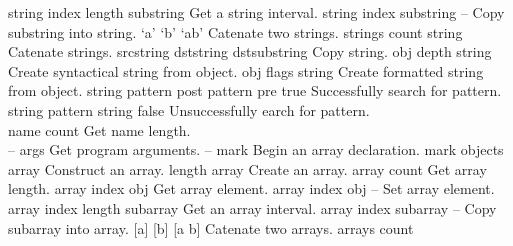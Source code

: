 \begin{longtable}{}
\hline
\optableent
	{string index length}
	{{\bf {}}}
	{substring}
	{Get a string interval.}
\hline
\optableent
	{string index substring}
	{{\bf {}}}
	{--}
	{Copy substring into string.}
\hline
\optableent
	{`a' `b'}
	{{\bf {}}}
	{`ab'}
	{Catenate two strings.}
\hline
\optableent
	{strings count}
	{{\bf {}}}
	{string}
	{Catenate strings.}
\hline
\optableent
	{srcstring dststring}
	{{\bf {}}}
	{dstsubstring}
	{Copy string.}
\hline
\optableent
	{obj depth}
	{{\bf {}}}
	{string}
	{Create syntactical string from object.}
\hline
\optableent
	{obj flags}
	{{\bf {}}}
	{string}
	{Create formatted string from object.}
\hline
\optableent
	{string pattern}
	{{\bf {}}}
	{post pattern pre true}
	{Successfully search for pattern.}
\optableent
	{string pattern}
	{{\bf {}}}
	{string false}
	{Unsuccessfully earch for pattern.}
\hline \hline
{} \\
\hline \hline
\optableent
	{name}
	{{\bf {}}}
	{count}
	{Get name length.}
\hline \hline
{} \\
\hline \hline
\optableent
	{--}
	{{\bf {}}}
	{args}
	{Get program arguments.}
\hline
\optableent
	{--}
	{{\bf \htmlref{[}{systemdict:sym_lb}}}
	{mark}
	{Begin an array declaration.}
\hline
\optableent
	{mark objects}
	{{\bf \htmlref{]}{systemdict:sym_rb}}}
	{array}
	{Construct an array.}
\hline
\optableent
	{length}
	{{\bf {}}}
	{array}
	{Create an array.}
\hline
\optableent
	{array}
	{{\bf {}}}
	{count}
	{Get array length.}
\hline
\optableent
	{array index}
	{{\bf {}}}
	{obj}
	{Get array element.}
\hline
\optableent
	{array index obj}
	{{\bf {}}}
	{--}
	{Set array element.}
\hline
\optableent
	{array index length}
	{{\bf {}}}
	{subarray}
	{Get an array interval.}
\hline
\optableent
	{array index subarray}
	{{\bf {}}}
	{--}
	{Copy subarray into array.}
\hline
\optableent
	{[a] [b]}
	{{\bf {}}}
	{[a b]}
	{Catenate two arrays.}
\hline
\optableent
	{arrays count}
	{{\bf {}}}

\end{longtable}
